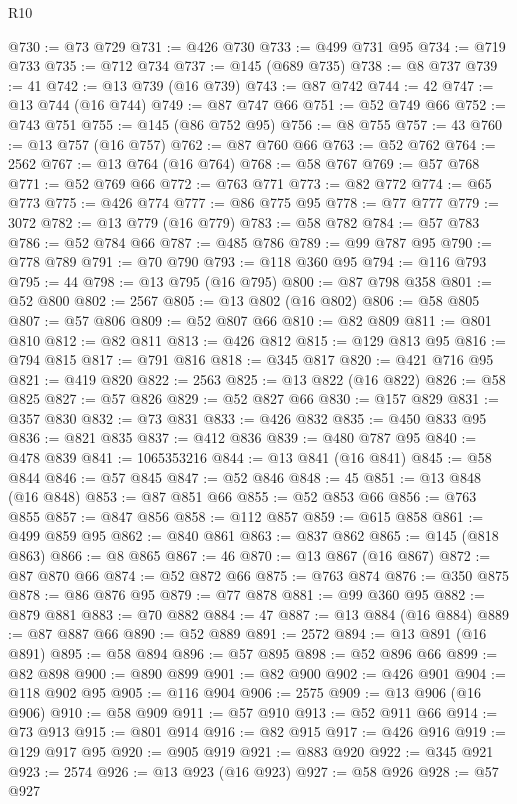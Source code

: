 \begin{lexlean}{R10}
\begin{coremodule}
@730 := @73 @729
@731 := @426 @730
@733 := @499 @731 @95
@734 := @719 @733
@735 := @712 @734
@737 := @145 (@689 @735)
@738 := @8 @737
@739 := 41
@742 := @13 @739 (@16 @739)
@743 := @87 @742
@744 := 42
@747 := @13 @744 (@16 @744)
@749 := @87 @747 @66
@751 := @52 @749 @66
@752 := @743 @751
@755 := @145 (@86 @752 @95)
@756 := @8 @755
@757 := 43
@760 := @13 @757 (@16 @757)
@762 := @87 @760 @66
@763 := @52 @762
@764 := 2562
@767 := @13 @764 (@16 @764)
@768 := @58 @767
@769 := @57 @768
@771 := @52 @769 @66
@772 := @763 @771
@773 := @82 @772
@774 := @65 @773
@775 := @426 @774
@777 := @86 @775 @95
@778 := @77 @777
@779 := 3072
@782 := @13 @779 (@16 @779)
@783 := @58 @782
@784 := @57 @783
@786 := @52 @784 @66
@787 := @485 @786
@789 := @99 @787 @95
@790 := @778 @789
@791 := @70 @790
@793 := @118 @360 @95
@794 := @116 @793
@795 := 44
@798 := @13 @795 (@16 @795)
@800 := @87 @798 @358
@801 := @52 @800
@802 := 2567
@805 := @13 @802 (@16 @802)
@806 := @58 @805
@807 := @57 @806
@809 := @52 @807 @66
@810 := @82 @809
@811 := @801 @810
@812 := @82 @811
@813 := @426 @812
@815 := @129 @813 @95
@816 := @794 @815
@817 := @791 @816
@818 := @345 @817
@820 := @421 @716 @95
@821 := @419 @820
@822 := 2563
@825 := @13 @822 (@16 @822)
@826 := @58 @825
@827 := @57 @826
@829 := @52 @827 @66
@830 := @157 @829
@831 := @357 @830
@832 := @73 @831
@833 := @426 @832
@835 := @450 @833 @95
@836 := @821 @835
@837 := @412 @836
@839 := @480 @787 @95
@840 := @478 @839
@841 := 1065353216
@844 := @13 @841 (@16 @841)
@845 := @58 @844
@846 := @57 @845
@847 := @52 @846
@848 := 45
@851 := @13 @848 (@16 @848)
@853 := @87 @851 @66
@855 := @52 @853 @66
@856 := @763 @855
@857 := @847 @856
@858 := @112 @857
@859 := @615 @858
@861 := @499 @859 @95
@862 := @840 @861
@863 := @837 @862
@865 := @145 (@818 @863)
@866 := @8 @865
@867 := 46
@870 := @13 @867 (@16 @867)
@872 := @87 @870 @66
@874 := @52 @872 @66
@875 := @763 @874
@876 := @350 @875
@878 := @86 @876 @95
@879 := @77 @878
@881 := @99 @360 @95
@882 := @879 @881
@883 := @70 @882
@884 := 47
@887 := @13 @884 (@16 @884)
@889 := @87 @887 @66
@890 := @52 @889
@891 := 2572
@894 := @13 @891 (@16 @891)
@895 := @58 @894
@896 := @57 @895
@898 := @52 @896 @66
@899 := @82 @898
@900 := @890 @899
@901 := @82 @900
@902 := @426 @901
@904 := @118 @902 @95
@905 := @116 @904
@906 := 2575
@909 := @13 @906 (@16 @906)
@910 := @58 @909
@911 := @57 @910
@913 := @52 @911 @66
@914 := @73 @913
@915 := @801 @914
@916 := @82 @915
@917 := @426 @916
@919 := @129 @917 @95
@920 := @905 @919
@921 := @883 @920
@922 := @345 @921
@923 := 2574
@926 := @13 @923 (@16 @923)
@927 := @58 @926
@928 := @57 @927

\end{coremodule}
\end{lexlean}
